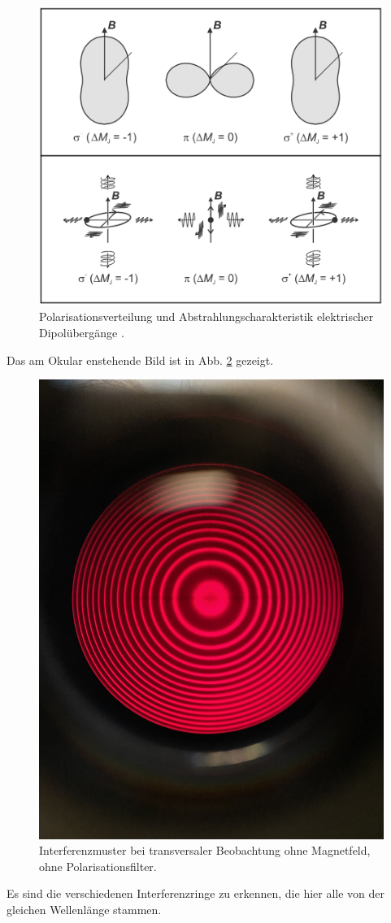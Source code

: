\documentclass{article}
\begin{document}
\begin{multicols}{2}
\begin{figure}[H]
  \centering
  \includegraphics[width=.8\linewidth]{zeeman-abstrahlung}
  \caption{Polarisationsverteilung und Abstrahlungscharakteristik elektrischer Dipolübergänge \cite{Anleitung} \cite{Leybold}.}
  \label{fig:zeeman-abstrahlung}
\end{figure}

Das am Okular enstehende Bild ist in Abb. \ref{fig:zeeman-transveral-ohne-ohne} gezeigt.
\begin{figure}[H]
  \centering
  \includegraphics[width=.8\linewidth]{zeeman-transversal-ohne-ohne}
  \caption{Interferenzmuster bei transversaler Beobachtung ohne Magnetfeld, ohne Polarisationsfilter.}
  \label{fig:zeeman-transveral-ohne-ohne}
\end{figure}
Es sind die verschiedenen Interferenzringe zu erkennen, die hier alle von der gleichen Wellenlänge stammen.


\end{multicols}
\end{document}
